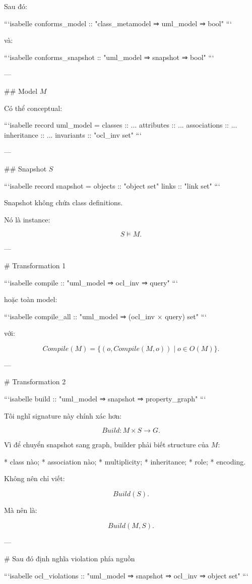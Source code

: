 Sau đó:

```isabelle
conforms_model ::
  "class_metamodel ⇒ uml_model ⇒ bool"
```

và:

```isabelle
conforms_snapshot ::
  "uml_model ⇒ snapshot ⇒ bool"
```

---

## Model \(M\)

Có thể conceptual:

```isabelle
record uml_model =
  classes      :: ...
  attributes   :: ...
  associations :: ...
  inheritance  :: ...
  invariants   :: "ocl_inv set"
```

---

## Snapshot \(S\)

```isabelle
record snapshot =
  objects :: "object set"
  links   :: "link set"
```

Snapshot không chứa class definitions.

Nó là instance:

$$
S\models M.
$$

---

# Transformation 1

```isabelle
compile ::
  "uml_model ⇒ ocl_inv ⇒ query"
```

hoặc toàn model:

```isabelle
compile_all ::
  "uml_model ⇒ (ocl_inv × query) set"
```

với:

$$
Compile(M)
=
\{(o,Compile(M,o))\mid o\in O(M)\}.
$$

---

# Transformation 2

```isabelle
build ::
  "uml_model ⇒ snapshot ⇒ property_graph"
```

Tôi nghĩ signature này chính xác hơn:

$$
\boxed{
Build:M\times S\rightarrow G.
}
$$

Vì để chuyển snapshot sang graph, builder phải biết structure của \(M\):

* class nào;
* association nào;
* multiplicity;
* inheritance;
* role;
* encoding.

Không nên chỉ viết:

$$
Build(S).
$$

Mà nên là:

$$
\boxed{
Build(M,S).
}
$$

---

# Sau đó định nghĩa violation phía nguồn

```isabelle
ocl_violations ::
  "uml_model ⇒ snapshot ⇒ ocl_inv ⇒ object set"
```

